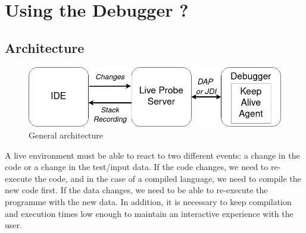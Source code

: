\documentclass[english,submission]{programming}
\begin{document}
\section{Using the Debugger ?}

\subsection{Architecture}

\begin{figure}[h]
  \centering
  \includegraphics[width=0.8\linewidth]{img/architecture_2.png}
  \caption{General architecture}
  \label{fig:architecture}
\end{figure}

A live environment must be able to react to two different events: a change in the code or a change in the test/input data. 
If the code changes, we need to re-execute the code, and in the case of a compiled language, we need to compile the new code first. 
If the data changes, we need to be able to re-execute the programme with the new data. 
In addition, it is necessary to keep compilation and execution times low enough to maintain an interactive experience with the user.
\end{document}
